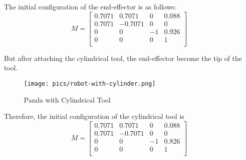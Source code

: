 \documentclass[english,10pt,a4paper]{book}
\begin{document}
		The initial configuration of the end-effector is as follows:
		$$M = \begin{bmatrix}
			0.7071 & 0.7071 & 0 & 0.088\\
			0.7071 & -0.7071 & 0 & 0\\
			0 & 0 & -1 & 0.926 \\
			0 & 0 & 0 & 1 \\
		\end{bmatrix}$$
		
		But after attaching the cylindrical tool, the end-effector become the tip of the tool.
		\begin{figure}[H]
			\begin{center}
				\texttt{[image: pics/robot-with-cylinder.png]}
			\end{center}
			\caption{Panda with Cylindrical Tool}
		\end{figure}
		
		Therefore, the initial configuration of the cylindrical tool is
		\begin{equation}
			M = \begin{bmatrix}
				0.7071 & 0.7071 & 0 & 0.088\\
				0.7071 & -0.7071 & 0 & 0\\
				0 & 0 & -1 & 0.826 \\
				0 & 0 & 0 & 1 \\
			\end{bmatrix}
		\end{equation}
		
\end{document}
